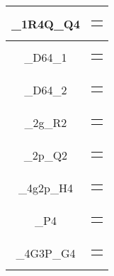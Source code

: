 \begin{appendices}
\begin{table}[H]
\begin{tabularx}{\textwidth}{ | c | X | }
    \_1R4Q\_Q4 &
    \begin{tabular}{@{}c@{}}
        $Q = Q_3 Q_2 Q_1 (Q_0 + R)$
    \end{tabular}\\\hline
    
    \_D64\_1 &
    \begin{tabular}{@{}c@{}}
        $D = g_1 + p_2g_0 + p_2p_1p_0$
    \end{tabular}\\\hline
    
    \_D64\_2 &
    \begin{tabular}{@{}c@{}}
        $D = D (R + Q)$
    \end{tabular}\\\hline
    
    \_2g\_R2 &
    \begin{tabular}{@{}c@{}}
        $R = g_1 + g_0$
    \end{tabular}\\\hline
    
    \_2p\_Q2 &
    \begin{tabular}{@{}c@{}}
        $Q = p_1p_0$
    \end{tabular}\\\hline
    
    \_4g2p\_H4 &
    \begin{tabular}{@{}c@{}}
        $H = g_3 + g_2 + p_1g_1 + p_1p_0g_0$
    \end{tabular}\\\hline
    
    \_P4 &
    \begin{tabular}{@{}c@{}}
        $P = p_3p_2p_1p_0$
    \end{tabular}\\\hline
    
    \_4G3P\_G4 &
    \begin{tabular}{@{}c@{}}
        $G = G_3 + P_2G_2 + P_2P_1G_1 + P_2P_1P_0G_0$
    \end{tabular}\\\hline
    

\end{tabularx}
\end{table}
\end{appendices}
